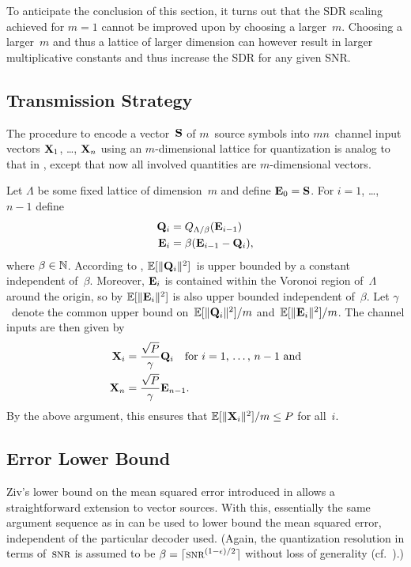 To anticipate the conclusion of this section, it turns out that the SDR scaling
achieved for $m=1$ cannot be improved upon by choosing a larger~$m$. Choosing a
larger~$m$ and thus a lattice of larger dimension can however result in larger
multiplicative constants and thus increase the SDR for any given SNR.


\subsection{Transmission Strategy}

The procedure to encode a vector~$\S$ of $m$~source symbols into $mn$~channel
input vectors $\X_1$, \ldots, $\X_n$ using an $m$-dimensional lattice for
quantization is analog to that in , except that now all
involved quantities are $m$-dimensional vectors.

Let $\Lambda$ be some fixed lattice of dimension~$m$ and define $\Evc_0 = \S$.
For $i = 1$, \ldots, $n-1$ define
\begin{align}
  \Q_i &= \QLb(\Evc_{i-1})  \nonumber \\
  \Evc_i &= \beta ( \Evc_{i-1} - \Q_i), \label{eq:latticeQE}
\end{align}
where $\beta \in \NN$. According to , $\E[\|\Q_i\|^2]$~is
upper bounded by a constant independent of~$\beta$. Moreover, $\Evc_i$
is contained within the Voronoi region of~$\Lambda$ around the origin, so by
 $\E[\|\Evc_i\|^2]$ is also upper bounded independent
of~$\beta$. Let $\gamma$~denote the common upper bound on~$\E[\|\Q_i\|^2]/m$
and~$\E[\|\Evc_i\|^2]/m$.  The channel inputs are then given by
\begin{align*}
  \X_i &= \frac{\sqrt{P}}{\gamma} \Q_i \quad \text{for $i = 1$, \dots, $n-1$
  and} \\
  \X_n &= \frac{\sqrt{P}}{\gamma} \Evc_{n-1}.
\end{align*}
By the above argument, this ensures that $\E[\|\X_i\|^2]/m \le P$ for all~$i$.



\subsection{Error Lower Bound}

Ziv's lower bound on the mean squared error introduced in 
allows a straightforward extension to vector sources. With this, essentially the
same argument sequence as in  can be used to lower bound the
mean squared error, independent of the particular decoder used.  (Again,
the quantization resolution in terms of~$\snr$ is assumed to be $\beta = \lceil
\snr^{(1-\e)/2} \rceil$ without loss of generality (cf.~).)

